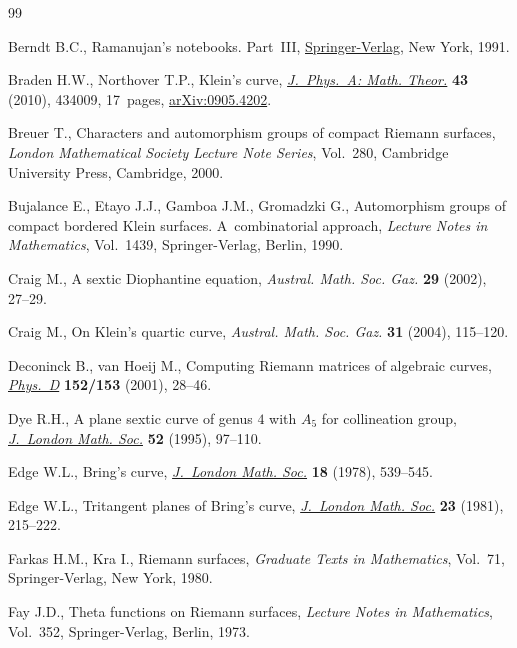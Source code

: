 \documentclass[pdftex]{sigma}
\numberwithin{equation}{section}
\begin{document}
\begin{thebibliography}{99}
\footnotesize\itemsep=0pt

Berndt B.C., Ramanujan's notebooks. {P}art~{III}, \href{http://dx.doi.org/10.1007/978-1-4612-0965-2}{Springer-Verlag}, New York,
  1991.

Braden H.W., Northover T.P., Klein's curve, \href{http://dx.doi.org/10.1088/1751-8113/43/43/434009}{\textit{J.~Phys.~A: Math. Theor.}}
  \textbf{43} (2010), 434009, 17~pages, \href{http://arxiv.org/abs/0905.4202}{arXiv:0905.4202}.

Breuer T., Characters and automorphism groups of compact {R}iemann surfaces,
  \textit{London Mathematical Society Lecture Note Series}, Vol.~280, Cambridge
  University Press, Cambridge, 2000.

Bujalance E., Etayo J.J., Gamboa J.M., Gromadzki G., Automorphism groups of
  compact bordered {K}lein surfaces. A~combinatorial approach, \textit{Lecture
  Notes in Mathematics}, Vol.~1439, Springer-Verlag, Berlin, 1990.

Craig M., A sextic {D}iophantine equation, \textit{Austral. Math. Soc. Gaz.}
  \textbf{29} (2002), 27--29.

Craig M., On {K}lein's quartic curve, \textit{Austral. Math. Soc. Gaz.}
  \textbf{31} (2004), 115--120.

Deconinck B., van Hoeij M., Computing {R}iemann matrices of algebraic curves,
  \href{http://dx.doi.org/10.1016/S0167-2789(01)00156-7}{\textit{Phys.~D}} \textbf{152/153} (2001), 28--46.

Dye R.H., A plane sextic curve of genus {$4$} with {$A_5$} for collineation
  group, \href{http://dx.doi.org/10.1112/jlms/52.1.97}{\textit{J.~London Math. Soc.}} \textbf{52} (1995), 97--110.

Edge W.L., Bring's curve, \href{http://dx.doi.org/10.1112/jlms/s2-18.3.539}{\textit{J.~London Math. Soc.}} \textbf{18} (1978),
  539--545.

Edge W.L., Tritangent planes of {B}ring's curve, \href{http://dx.doi.org/10.1112/jlms/s2-23.2.215}{\textit{J.~London Math. Soc.}}
  \textbf{23} (1981), 215--222.

Farkas H.M., Kra I., Riemann surfaces, \textit{Graduate Texts in Mathematics},
  Vol.~71, Springer-Verlag, New York, 1980.

Fay J.D., Theta functions on {R}iemann surfaces, \textit{Lecture Notes in
  Mathematics}, Vol.~352, Springer-Verlag, Berlin, 1973.


\end{thebibliography}
\end{document}
